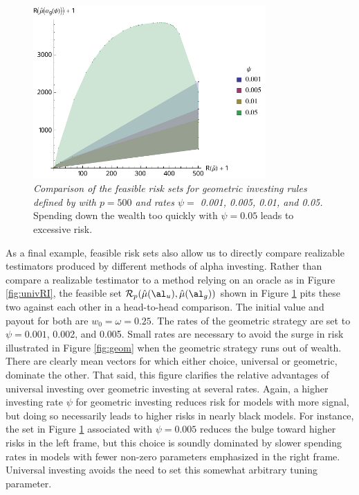 \documentclass[12pt]{article}
\begin{document}
\begin{figure}
 \caption{ \label{fig:univGeo} {\sl Comparison of the feasible risk sets for
 geometric investing rules defined by  with $p=500$ and rates
 $\psi=$ 0.001, 0.005, 0.01, and 0.05.}  Spending down the wealth too quickly
 with $\psi=0.05$ leads to excessive risk.  }

 \vspace{0.1in}
 \centerline{
   \includegraphics[width=3.5in]{figures/geom}     }
 \vspace{0.2in}
\end{figure}


 As a final example, feasible risk sets also allow us to directly compare
 realizable testimators produced by different methods of alpha investing.
  Rather than compare a realizable testimator to a method relying on an oracle
 as in Figure \ref{fig:univRI}, the feasible set ${\cal R}_p (\hat\mu(\al_u),
 \hat\mu(\al_g))$ shown in Figure \ref{fig:univGeo} pits these two against each
 other in a head-to-head comparison.  The initial value and payout for both are
 $w_0 = \omega = 0.25$.  The rates of the geometric strategy are set to
 $\psi=0.001$, 0.002, and 0.005.  Small rates are necessary to avoid the surge
 in risk illustrated in Figure \ref{fig:geom} when the geometric strategy runs
 out of wealth.  There are clearly mean vectors for which either choice,
 universal or geometric, dominate the other.  That said, this figure clarifies
 the relative advantages of universal investing over geometric investing at
 several rates.  Again, a higher investing rate $\psi$ for geometric investing
 reduces risk for models with more signal, but doing so necessarily leads to
 higher risks in nearly black models.  For instance, the set in Figure
 \ref{fig:univGeo} associated with $\psi = 0.005$ reduces the bulge toward higher
 risks in the left frame, but this choice is soundly dominated by slower
 spending rates in models with fewer non-zero parameters emphasized in the right
 frame.  Universal investing avoids the need to set this somewhat arbitrary
 tuning parameter.
\end{document}
